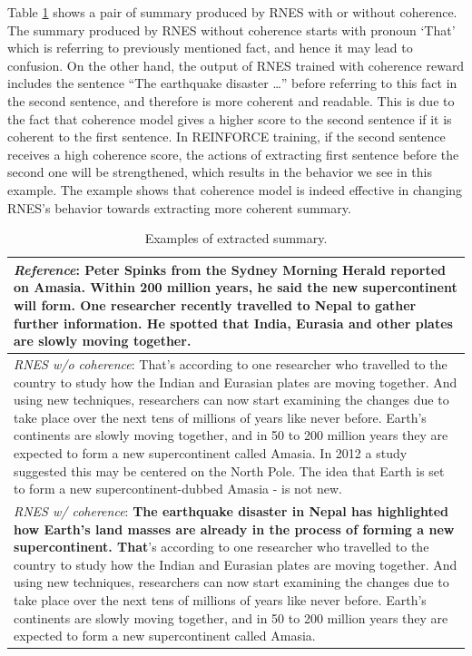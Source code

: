 \documentclass[letterpaper]{article} %
\begin{document}
	Table \ref{tab:summary_examples} shows a pair of summary produced by RNES with or without coherence. The summary produced by RNES without coherence starts with pronoun `That' which is referring to previously mentioned fact, and hence it may lead to confusion. On the other hand, the output of RNES trained with coherence reward includes the sentence ``The earthquake disaster \dots'' before referring to this fact in the second sentence, and therefore is more coherent and readable. This is due to the fact that coherence model gives a higher score to the second sentence if it is coherent to the first sentence. In REINFORCE training, if the second sentence receives a high coherence score, the actions of extracting first sentence before the second one will be strengthened, which results in the behavior we see in this example. The example shows that coherence model is indeed effective in changing RNES's behavior towards extracting more coherent summary.
	
	
	\begin{table}[ht]
		\centering
		\caption{Examples of extracted summary.}
		\label{tab:summary_examples}
		
		\begin{tabular}{|p{80mm}|}
			\hline
			\small{\textit{Reference}: Peter Spinks from the Sydney Morning Herald reported on Amasia. Within 200 million years, he said the new supercontinent will form. One researcher recently travelled to Nepal to gather further information. He spotted that India, Eurasia and other plates are slowly moving together.} \\\hline
			
			\small{\textit{RNES w/o coherence}: That's according to one researcher who travelled to the country to study how the Indian and Eurasian plates are moving together. And using new techniques, researchers can now start examining the changes due to take place over the next tens of millions of years like never before. Earth's continents are slowly moving together, and in 50 to 200 million years they are expected to form a new supercontinent called Amasia. In 2012 a study suggested this may be centered on the North Pole. The idea that Earth is set to form a new supercontinent-dubbed Amasia - is not new.}\\\hline

			\small{\textit{RNES w/ coherence}: \textbf{The earthquake disaster in Nepal has highlighted how Earth's land masses are already in the process of forming a new supercontinent. That}'s according to one researcher who travelled to the country to study how the Indian and Eurasian plates are moving together. And using new techniques, researchers can now start examining the changes due to take place over the next tens of millions of years like never before. Earth's continents are slowly moving together, and in 50 to 200 million years they are expected to form a new supercontinent called Amasia.} \\
			\hline
		\end{tabular}
	\end{table}
	
\end{document}
